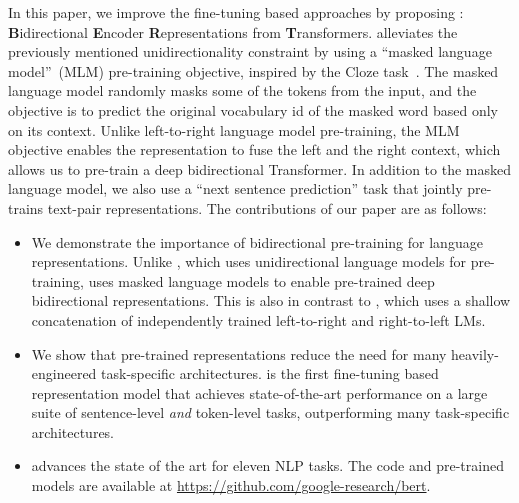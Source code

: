 In this paper, we improve the fine-tuning based approaches by proposing \bert: \textbf{B}idirectional \textbf{E}ncoder \textbf{R}epresentations from \textbf{T}ransformers. \bert alleviates the previously mentioned unidirectionality constraint by using a ``masked language model''~(MLM) pre-training objective, inspired by the Cloze task~\cite{taylor:1953:_cloze}. The masked language model randomly masks some of the tokens from the input, and the objective is to predict the original vocabulary id of the masked word based only on its context. Unlike left-to-right language model pre-training, the MLM objective enables the representation to fuse the left and the right context, which allows us to pre-train a deep bidirectional Transformer. In addition to the masked language model, we also use a ``next sentence prediction'' task that jointly pre-trains text-pair representations. The contributions of our paper are as follows:
\begin{itemize}[leftmargin=1em]
  \item We demonstrate the importance of bidirectional pre-training for language representations. Unlike \citet{radford-etal:2018}, which uses unidirectional language models for pre-training, \bert uses masked language models to enable pre-trained deep bidirectional representations. This is also in contrast to \citet{peters-etal:2018:_deep}, which uses a shallow concatenation of independently trained left-to-right and right-to-left LMs.
  \item We show that pre-trained representations reduce the need for many heavily-engineered task-specific architectures. \bert is the first fine-tuning based representation model that achieves state-of-the-art performance on a large suite of sentence-level {\em and} token-level tasks, outperforming many task-specific architectures.
  \item \bert advances the state of the art for eleven NLP tasks. 
%
    The code and pre-trained models are available at \url{https://github.com/google-research/bert}.
\end{itemize}



\documentclass[11pt,a4paper]{article}
\usepackage[hyperref]{naaclhlt2019}
\usepackage{times}
\usepackage{latexsym}
\usepackage{xspace}
\usepackage{multirow}
\usepackage{url}
\usepackage{booktabs}
\usepackage{tikz,tikz-qtree}
\usepackage{pgfplots}
\usepackage{amssymb}
\usepackage{xfrac}
\usepackage{graphicx}
\usepackage{tablefootnote}
\usepackage{amsmath}
\usepackage{enumitem}
\pgfplotsset{compat=1.14}

